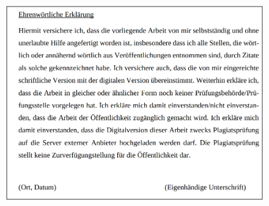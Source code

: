 


\begin{figure}[H]
\centering
	\includegraphics[width=\textwidth]{latex_einstellungen/ehrenwoertliche_erklaerung/ehren_erklaerung.png}
\end{figure}

